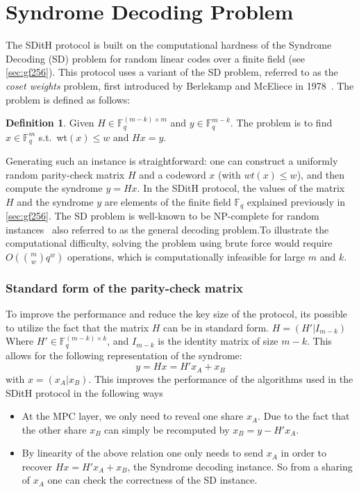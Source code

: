 \documentclass[11pt]{report}
\theoremstyle{definition}
\newtheorem{definition}{Definition}[section]
\theoremstyle{plain}
\begin{document}
\section{Syndrome Decoding Problem}\label{sec:syndrome}

The SDitH protocol is built on the computational hardness of the Syndrome Decoding (SD) problem for random linear codes over a finite field (see \autoref{sec:gf256}). This protocol uses a variant of the SD problem, referred to as the \textit{coset weights} problem, first introduced by Berlekamp and McEliece in 1978~\cite{berlekamp1978inherent}. The problem is defined as follows:
\begin{definition}\label{def:syndrome}
  Given $H \in \mathbb{F}^{(m-k)\times m}_q$ and $y \in \mathbb{F}^{m-k}_q$. The problem is to find $x \in \mathbb{F}^m_q$ s.t.\ wt$(x) \leq w$ and $Hx = y$.
\end{definition}
Generating such an instance is straightforward: one can construct a uniformly random parity-check matrix $H$ and a codeword $x$ (with $wt(x) \leq w$), and then compute the syndrome $y = Hx$. In the SDitH protocol, the values of the matrix $H$ and the syndrome $y$ are elements of the finite field $\mathbb{F}_q$ explained previously in \autoref{sec:gf256}. The SD problem is well-known to be NP-complete for random instances~\cite{berlekamp1978inherent} also referred to as the general decoding problem.To illustrate the computational difficulty, solving the problem using brute force would require $O(\binom{m}{w} q^w)$ operations, which is computationally infeasible for large $m$ and $k$.

\subsubsection{Standard form of the parity-check matrix}\label{sub:standard_form_of_the_parity_check_matrix}
To improve the performance and reduce the key size of the protocol, its possible to utilize the fact that the matrix $H$ can be in standard form. $H = (H'|I_{m-k}) $ Where $H' \in \mathbb{F}^{(m-k)\times k}_q$, and $I_{m-k}$ is the identity matrix of size $m-k$. This allows for the following representation of the syndrome:
\begin{equation}
  y = Hx = H'x_A + x_B\label{eq:standard_form_of_the_parity_check_matrix}
\end{equation}
with $x = (x_A | x_B)$. This improves the performance of the algorithms used in the SDitH protocol in the following ways
\begin{itemize}
  \item At the MPC layer, we only need to reveal one share $x_A$. Due to the fact that the other share $x_B$ can simply be recomputed by $x_B = y - H'x_A$.
  \item By linearity of the above relation one only needs to send $x_A$ in order to recover $Hx = H'x_A + x_B$, the Syndrome decoding instance. So from a sharing of $x_A$ one can check the correctness of the SD instance.
\end{itemize}
\end{document}
